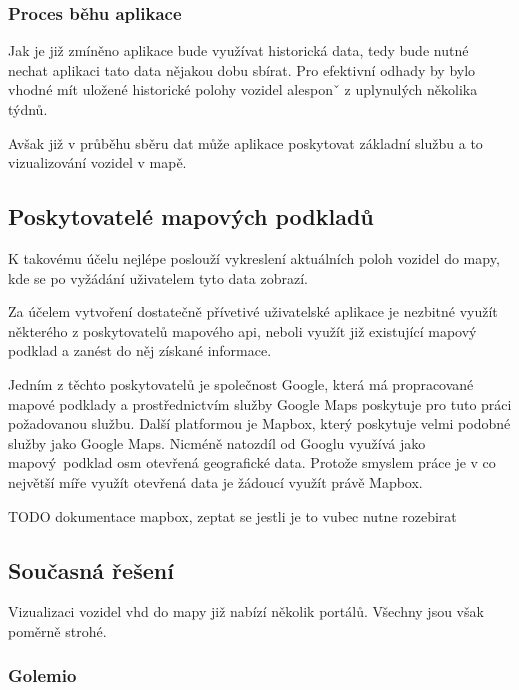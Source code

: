 \subsubsection{Proces běhu aplikace}

Jak je již zmíněno aplikace bude využívat historická data, tedy bude nutné nechat aplikaci tato data nějakou dobu sbírat. Pro efektivní odhady by bylo vhodné mít uložené historické polohy vozidel alesponˇ z uplynulých několika týdnů.

\bigbreak

Avšak již v průběhu sběru dat může aplikace poskytovat základní službu a to vizualizování vozidel v mapě.

\subsection{Poskytovatelé mapových podkladů}

K takovému účelu nejlépe poslouží vykreslení aktuálních poloh vozidel do mapy, kde se po vyžádání uživatelem tyto data zobrazí.

\bigbreak

Za účelem vytvoření dostatečně přívetivé uživatelské aplikace je nezbitné využít některého z poskytovatelů mapového \gls{api}, neboli využít již existující mapový podklad a zanést do něj získané informace.

\bigbreak

Jedním z těchto poskytovatelů je společnost Google, která má propracované mapové podklady a prostřednictvím služby Google Maps poskytuje pro tuto práci požadovanou službu. Další platformou je Mapbox, který poskytuje velmi podobné služby jako Google Maps. Nicméně natozdíl od Googlu využívá jako mapový podklad \gls{osm} {otevřená geografické data}. Protože smyslem práce je v co největší míře využít otevřená data je žádoucí využít právě Mapbox.

\bigbreak

TODO dokumentace mapbox, zeptat se jestli je to vubec nutne rozebirat

\subsection{Současná řešení}

Vizualizaci vozidel \gls{vhd} do mapy již nabízí několik portálů. Všechny jsou však poměrně strohé.

\subsubsection{Golemio}

